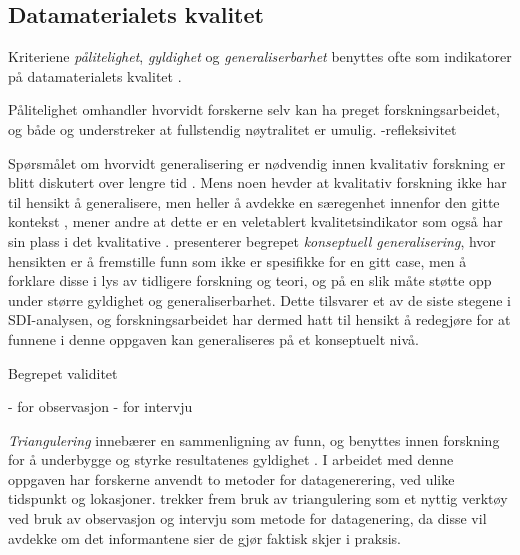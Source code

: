 \subsection{Datamaterialets kvalitet}
Kriteriene \textit{pålitelighet}, \textit{gyldighet} og \textit{generaliserbarhet} benyttes ofte som indikatorer på datamaterialets kvalitet \citep{Tjora}.

\noindent
Pålitelighet omhandler hvorvidt forskerne selv kan ha preget forskningsarbeidet, og både \citet{Oates} og \citet{Tjora} understreker at fullstendig nøytralitet er umulig. 
-refleksivitet

\noindent
Spørsmålet om hvorvidt generalisering er nødvendig innen kvalitativ forskning er blitt diskutert over lengre tid \citep{Tjora}. Mens noen hevder at kvalitativ forskning ikke har til hensikt å generalisere, men heller å avdekke en særegenhet innenfor den gitte kontekst \citep{Creswell, Oates}, mener andre at dette er en veletablert kvalitetsindikator som også har sin plass i det kvalitative \citep{Tjora}. \citet{Tjora} presenterer begrepet \textit{konseptuell generalisering}, hvor hensikten er å fremstille funn som ikke er spesifikke for en gitt case, men å forklare disse i lys av tidligere forskning og teori, og på en slik måte støtte opp under større gyldighet og generaliserbarhet. Dette tilsvarer et av de siste stegene i SDI-analysen, og forskningsarbeidet har dermed hatt til hensikt å redegjøre for at funnene i denne oppgaven kan generaliseres på et konseptuelt nivå. 


\noindent
Begrepet validitet

- for observasjon
- for intervju

\noindent
\textit{Triangulering} innebærer en sammenligning av funn, og benyttes innen forskning for å underbygge og styrke resultatenes gyldighet \citep{Silvermann, Oates}. I arbeidet med denne oppgaven har forskerne anvendt to metoder for datagenerering, ved ulike tidspunkt og lokasjoner. \citet{Oates} trekker frem bruk av triangulering som et nyttig verktøy ved bruk av observasjon og intervju som metode for datagenering, da disse vil avdekke om det informantene sier de gjør faktisk skjer i praksis.
		
